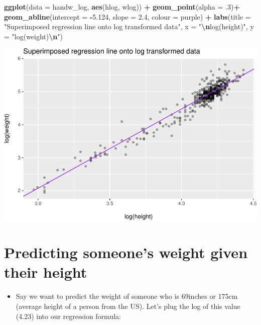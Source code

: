 \documentclass[
]{article}
\newenvironment{Shaded}{\begin{snugshade}}{\end{snugshade}}
\newcommand{\AttributeTok}[1]{\textcolor[rgb]{0.13,0.29,0.53}{#1}}
\newcommand{\DecValTok}[1]{\textcolor[rgb]{0.00,0.00,0.81}{#1}}
\newcommand{\FloatTok}[1]{\textcolor[rgb]{0.00,0.00,0.81}{#1}}
\newcommand{\FunctionTok}[1]{\textcolor[rgb]{0.13,0.29,0.53}{\textbf{#1}}}
\newcommand{\NormalTok}[1]{#1}
\newcommand{\SpecialCharTok}[1]{\textcolor[rgb]{0.81,0.36,0.00}{\textbf{#1}}}
\newcommand{\StringTok}[1]{\textcolor[rgb]{0.31,0.60,0.02}{#1}}
\providecommand{\tightlist}{%
  \setlength{\itemsep}{0pt}\setlength{\parskip}{0pt}}
\begin{document}
\begin{Shaded}
\begin{Highlighting}[]
\FunctionTok{ggplot}\NormalTok{(}\AttributeTok{data =}\NormalTok{ handw\_log, }
       \FunctionTok{aes}\NormalTok{(hlog, wlog)) }\SpecialCharTok{+}
  \FunctionTok{geom\_point}\NormalTok{(}\AttributeTok{alpha =}\NormalTok{ .}\DecValTok{3}\NormalTok{)}\SpecialCharTok{+}
  \FunctionTok{geom\_abline}\NormalTok{(}\AttributeTok{intercept =} \SpecialCharTok{{-}}\FloatTok{5.124}\NormalTok{, }
              \AttributeTok{slope =} \FloatTok{2.4}\NormalTok{, }
              \AttributeTok{colour =} \StringTok{\textquotesingle{}purple\textquotesingle{}}\NormalTok{) }\SpecialCharTok{+}
  \FunctionTok{labs}\NormalTok{(}\AttributeTok{title =} \StringTok{"Superimposed regression line onto log transformed data"}\NormalTok{,}
       \AttributeTok{x =} \StringTok{"}\SpecialCharTok{\textbackslash{}n}\StringTok{log(height)"}\NormalTok{, }
       \AttributeTok{y =} \StringTok{"log(weight)}\SpecialCharTok{\textbackslash{}n}\StringTok{"}\NormalTok{)}
\end{Highlighting}
\end{Shaded}

\includegraphics{L8_Correlation_and_regression_pdf_files/figure-latex/unnamed-chunk-9-1.pdf}

\hypertarget{predicting-someones-weight-given-their-height}{%
\section{Predicting someone's weight given their
height}\label{predicting-someones-weight-given-their-height}}

\begin{itemize}
\tightlist
\item
  Say we want to predict the weight of someone who is 69inches or 175cm
  (average height of a person from the US). Let's plug the log of this
  value (4.23) into our regression formula:
\end{itemize}
\end{document}
